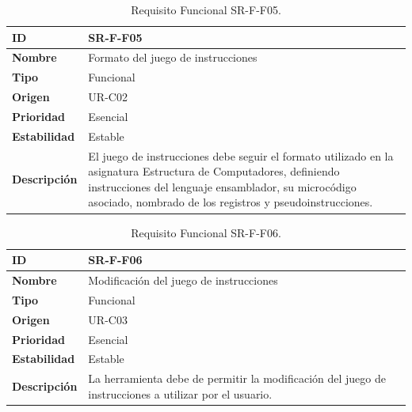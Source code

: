 \begin{center}
\begin{table}[htbp]
\centering
\begin{tabular}{@{}p{2.5cm} p{9cm}@{}} 
\toprule
\textbf{ID} 				& SR-F-F05 \\
\midrule
\textbf{Nombre} 			& Formato del juego de instrucciones\\
\midrule
\textbf{Tipo} 			& Funcional \\
\midrule
\textbf{Origen} 			& UR-C02 \\
\midrule
\textbf{Prioridad}		& Esencial \\
\midrule
\textbf{Estabilidad} 		& Estable \\
\midrule
\textbf{Descripción} 	& El juego de instrucciones debe seguir el formato utilizado en la asignatura Estructura de Computadores, definiendo instrucciones del lenguaje ensamblador, su microcódigo asociado, nombrado de los registros y pseudoinstrucciones. \\
\bottomrule
\end{tabular}
\caption{Requisito Funcional SR-F-F05.}
\label{tab:srff05}
\end{table}
\end{center}

\begin{center}
\begin{table}[htbp]
\centering
\begin{tabular}{@{}p{2.5cm} p{9cm}@{}} 
\toprule
\textbf{ID} 				& SR-F-F06 \\
\midrule
\textbf{Nombre} 			& Modificación del juego de instrucciones\\
\midrule
\textbf{Tipo} 			& Funcional \\
\midrule
\textbf{Origen} 			& UR-C03 \\
\midrule
\textbf{Prioridad}		& Esencial \\
\midrule
\textbf{Estabilidad} 		& Estable \\
\midrule
\textbf{Descripción} 	& La herramienta debe de permitir la modificación del juego de instrucciones a utilizar por el usuario. \\
\bottomrule
\end{tabular}
\caption{Requisito Funcional SR-F-F06.}
\label{tab:srff06}
\end{table}
\end{center}

